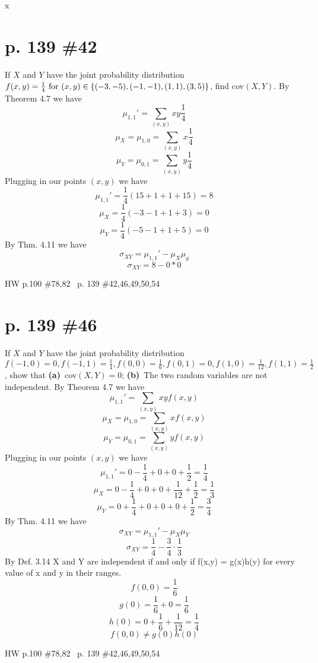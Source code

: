 x\documentclass[12pt]{article}
\begin{document}
\section[20pt]{p. 139 \#42}
If \(X\) and \(Y\) have the joint probability distribution \(f(x,y) = \frac{1}{4} \textup{ for } (x,y)\in\{(-3,-5),(-1,-1),(1,1),(3,5)\}\), find cov\((X,Y)\).
\newline \newline
By Theorem 4.7 we have
\[\mu_{1,1}'=\sum_{(x,y)}xy\frac{1}{4}\]
\[\mu_X=\mu_{1,0}=\sum_{(x,y)}x\frac{1}{4}\]
\[\mu_Y=\mu_{0,1}=\sum_{(x,y)}y\frac{1}{4}\]
Plugging in our points \((x,y)\) we have
\[\mu_{1,1}'=\frac{1}{4}(15+1+1+15)=8\]
\[\mu_X=\frac{1}{4}(-3-1+1+3)=0\]
\[\mu_Y=\frac{1}{4}(-5-1+1+5)=0\]
By Thm. 4.11 we have
\[\sigma_{XY}=\mu_{1,1}'-\mu_X\mu_y\]
\[\sigma_{XY}=8-0*0\]
\newpage
\maketitle HW p.100 \#78,82 \ p. 139 \#42,46,49,50,54
\section[20pt]{p. 139 \#46}
If \(X\) and \(Y\) have the joint probability distribution \(f(-1,0)=0,f(-1,1)=\frac{1}{4},f(0,0)=\frac{1}{6},f(0,1)=0,f(1,0)=\frac{1}{12},f(1,1)=\frac{1}{2}\), show that \newline
\textbf{(a)}\ cov\((X,Y)=0\); \newline
\textbf{(b)}\ The two random variables are not independent.
\newline \newline
By Theorem 4.7 we have
\[\mu_{1,1}'=\sum_{(x,y)}xyf(x,y)\]
\[\mu_X=\mu_{1,0}=\sum_{(x,y)}xf(x,y)\]
\[\mu_Y=\mu_{0,1}=\sum_{(x,y)}yf(x,y)\]
Plugging in our points \((x,y)\) we have
\[\mu_{1,1}'=0-\frac{1}{4}+0+0+\frac{1}{2}=\frac{1}{4}\]
\[\mu_X=0-\frac{1}{4}+0+0+\frac{1}{12}+\frac{1}{2}=\frac{1}{3}\]
\[\mu_Y=0+\frac{1}{4}+0+0+0+\frac{1}{2}=\frac{3}{4}\]
By Thm. 4.11 we have
\[\sigma_{XY}=\mu_{1,1}'-\mu_X\mu_Y\]
\[\sigma_{XY}=\frac{1}{4}-\frac{3}{4}\cdot \frac{1}{3}\]
 \newline \newline
By Def. 3.14 X and Y are independent if and only if f(x,y) = g(x)h(y) for every value of x and y in their ranges.
\[f(0,0)=\frac{1}{6}\]
\[g(0)=\frac{1}{6}+0=\frac{1}{6}\]
\[h(0)=0+\frac{1}{6}+\frac{1}{12}=\frac{1}{4}\]
\[f(0,0)\neq g(0)h(0)\]
\newpage
\maketitle HW p.100 \#78,82 \ p. 139 \#42,46,49,50,54
\end{document}

